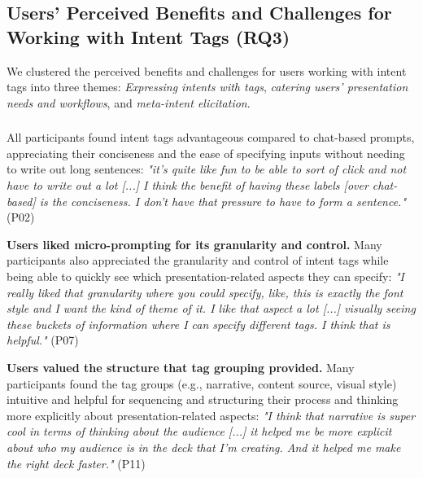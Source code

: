 \subsection{Users’ Perceived Benefits and Challenges for Working with Intent Tags (RQ3)}

We clustered the perceived benefits and challenges for users working with intent tags into three themes: \textit{Expressing intents with tags}, \textit{catering users' presentation needs and workflows}, and \textit{meta-intent elicitation}. 



\subsubsection{\textbf{}} \label{expressing-intents-with-tags}


All participants found intent tags advantageous compared to chat-based prompts, appreciating their conciseness and the ease of specifying inputs without needing to write out long sentences: \textit{"it's quite like fun to be able to sort of click and not have to write out a lot [...] I think the benefit of having these labels [over chat-based] is the conciseness. I don't have that pressure to have to form a sentence."} (P02)




\textbf{Users liked micro-prompting for its granularity and control.}
Many participants also appreciated the granularity and control of intent tags while being able to quickly see which presentation-related aspects they can specify: \textit{"I really liked that granularity where you could specify, like, this is exactly the font style and I want the kind of theme of it. I like that aspect a lot [...] visually seeing these buckets of information where I can specify different tags. I think that is helpful."} (P07)



\textbf{Users valued the structure that tag grouping provided.}
Many participants found the tag groups (e.g., narrative, content source, visual style) intuitive and helpful for sequencing and structuring their process and thinking more explicitly about presentation-related aspects: \textit{"I think that narrative is super cool in terms of thinking about the audience [...] it helped me be more explicit about who my audience is in the deck that I'm creating. And it helped me make the right deck faster."} (P11)



